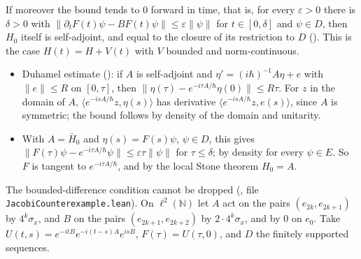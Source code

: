 \documentclass[11pt]{article}
\begin{document}
If moreover the bound tends to $0$ forward in time, that is, for every $\varepsilon > 0$ there is
$\delta > 0$ with $\|\partial_t F(t)\psi - B F(t)\psi\| \le \varepsilon\|\psi\|$ for
$t \in [0,\delta]$ and $\psi \in D$, then $H_0$ itself is self-adjoint, and equal to the closure of
its restriction to $D$ (). This is the case
$H(t) = H + V(t)$ with $V$ bounded and norm-continuous.
\begin{itemize}
\item Duhamel estimate (): if $A$ is self-adjoint and
  $\eta' = (i\hbar)^{-1}A\eta + e$ with $\|e\| \le R$ on $[0,\tau]$, then
  $\|\eta(\tau) - e^{-i\tau A/\hbar}\eta(0)\| \le R\tau$. For $z$ in the domain of $A$,
  $\langle e^{-isA/\hbar}z, \eta(s)\rangle$ has derivative
  $\langle e^{-isA/\hbar}z, e(s)\rangle$, since $A$ is symmetric; the bound follows by density
  of the domain and unitarity.
\item With $A = \bar H_0$ and $\eta(s) = F(s)\psi$, $\psi \in D$, this gives
  $\|F(\tau)\psi - e^{-i\tau A/\hbar}\psi\| \le \varepsilon\tau\|\psi\|$ for $\tau \le \delta$; by
  density for every $\psi \in E$. So $F$ is tangent to $e^{-i\tau A/\hbar}$, and by the local
  Stone theorem $H_0 = A$.
\end{itemize}
The bounded-difference condition cannot be dropped
(, file \texttt{JacobiCounterexample.lean}). On
$\ell^2(\mathbb{N})$ let $A$ act on the pairs $(e_{2k}, e_{2k+1})$ by $4^k\sigma_x$, and $B$ on
the pairs $(e_{2k+1}, e_{2k+2})$ by $2\cdot 4^k\sigma_x$, and by $0$ on $e_0$. Take
$U(t,s) = e^{-itB}e^{-i(t-s)A}e^{isB}$, $F(\tau) = U(\tau,0)$, and $D$ the finitely supported
sequences.
\end{document}
